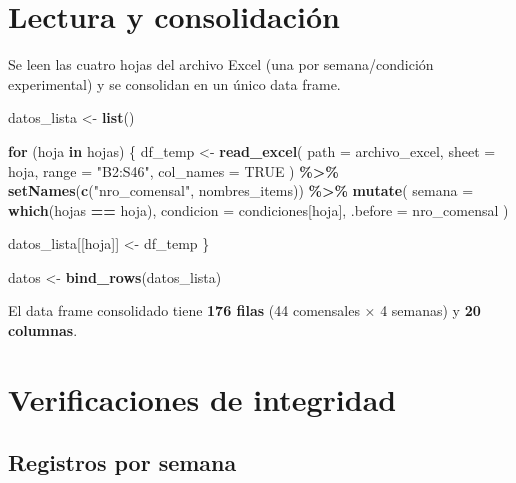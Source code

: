 \documentclass[
  spanish,
]{article}
\newenvironment{Shaded}{\begin{snugshade}}{\end{snugshade}}
\newcommand{\AttributeTok}[1]{\textcolor[rgb]{0.13,0.29,0.53}{#1}}
\newcommand{\ConstantTok}[1]{\textcolor[rgb]{0.56,0.35,0.01}{#1}}
\newcommand{\ControlFlowTok}[1]{\textcolor[rgb]{0.13,0.29,0.53}{\textbf{#1}}}
\newcommand{\FunctionTok}[1]{\textcolor[rgb]{0.13,0.29,0.53}{\textbf{#1}}}
\newcommand{\NormalTok}[1]{#1}
\newcommand{\OtherTok}[1]{\textcolor[rgb]{0.56,0.35,0.01}{#1}}
\newcommand{\SpecialCharTok}[1]{\textcolor[rgb]{0.81,0.36,0.00}{\textbf{#1}}}
\newcommand{\StringTok}[1]{\textcolor[rgb]{0.31,0.60,0.02}{#1}}
\begin{document}
\section{Lectura y consolidación}\label{lectura-y-consolidaciuxf3n}

Se leen las cuatro hojas del archivo Excel (una por semana/condición
experimental) y se consolidan en un único data frame.

\begin{Shaded}
\begin{Highlighting}[]
\NormalTok{datos\_lista }\OtherTok{\textless{}{-}} \FunctionTok{list}\NormalTok{()}

\ControlFlowTok{for}\NormalTok{ (hoja }\ControlFlowTok{in}\NormalTok{ hojas) \{}
\NormalTok{  df\_temp }\OtherTok{\textless{}{-}} \FunctionTok{read\_excel}\NormalTok{(}
    \AttributeTok{path      =}\NormalTok{ archivo\_excel,}
    \AttributeTok{sheet     =}\NormalTok{ hoja,}
    \AttributeTok{range     =} \StringTok{"B2:S46"}\NormalTok{,}
    \AttributeTok{col\_names =} \ConstantTok{TRUE}
\NormalTok{  ) }\SpecialCharTok{\%\textgreater{}\%}
    \FunctionTok{setNames}\NormalTok{(}\FunctionTok{c}\NormalTok{(}\StringTok{"nro\_comensal"}\NormalTok{, nombres\_items)) }\SpecialCharTok{\%\textgreater{}\%}
    \FunctionTok{mutate}\NormalTok{(}
      \AttributeTok{semana    =} \FunctionTok{which}\NormalTok{(hojas }\SpecialCharTok{==}\NormalTok{ hoja),}
      \AttributeTok{condicion =}\NormalTok{ condiciones[hoja],}
      \AttributeTok{.before   =}\NormalTok{ nro\_comensal}
\NormalTok{    )}

\NormalTok{  datos\_lista[[hoja]] }\OtherTok{\textless{}{-}}\NormalTok{ df\_temp}
\NormalTok{\}}

\NormalTok{datos }\OtherTok{\textless{}{-}} \FunctionTok{bind\_rows}\NormalTok{(datos\_lista)}
\end{Highlighting}
\end{Shaded}

El data frame consolidado tiene \textbf{176 filas} (44 comensales × 4
semanas) y \textbf{20 columnas}.

\section{Verificaciones de
integridad}\label{verificaciones-de-integridad}

\subsection{Registros por semana}\label{registros-por-semana}
\end{document}
